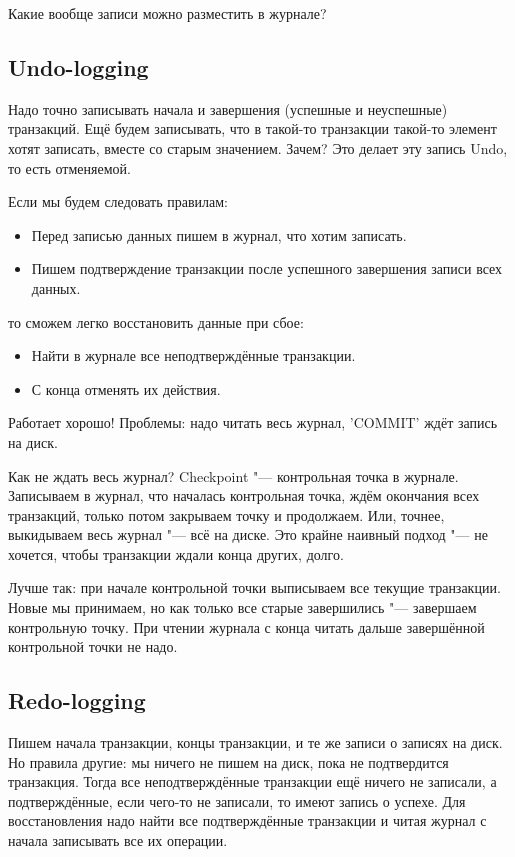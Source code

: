 Какие вообще записи можно разместить в журнале?

\subsection{Undo-logging}
Надо точно записывать начала и завершения (успешные и неуспешные) транзакций.
Ещё будем записывать, что в такой-то транзакции такой-то элемент хотят записать, вместе со старым значением.
Зачем? Это делает эту запись Undo, то есть отменяемой.

Если мы будем следовать правилам:
\begin{itemize}
\item
	Перед записью данных пишем в журнал, что хотим записать.
\item
	Пишем подтверждение транзакции после успешного завершения записи всех данных.
\end{itemize}
то сможем легко восстановить данные при сбое:
\begin{itemize}
\item
	Найти в журнале все неподтверждённые транзакции.
\item
	С конца отменять их действия.
\end{itemize}

Работает хорошо!
Проблемы: надо читать весь журнал, \sql'COMMIT' ждёт запись на диск.

Как не ждать весь журнал?
Checkpoint "--- контрольная точка в журнале.
Записываем в журнал, что началась контрольная точка, ждём окончания всех транзакций, только потом закрываем точку и продолжаем.
Или, точнее, выкидываем весь журнал "--- всё на диске. Это крайне наивный подход "--- не хочется, чтобы транзакции ждали конца других, долго.

Лучше так: при начале контрольной точки выписываем все текущие транзакции. Новые мы принимаем, но как только все старые завершились "--- завершаем контрольную точку. При чтении журнала с конца читать дальше завершённой контрольной точки не надо.

\subsection{Redo-logging}
Пишем начала транзакции, концы транзакции, и те же записи о записях на диск.
Но правила другие: мы ничего не пишем на диск, пока не подтвердится транзакция.
Тогда все неподтверждённые транзакции ещё ничего не записали, а подтверждённые, если чего-то не записали, то имеют запись о успехе.
Для восстановления надо найти все подтверждённые транзакции и читая журнал с начала записывать все их операции.

